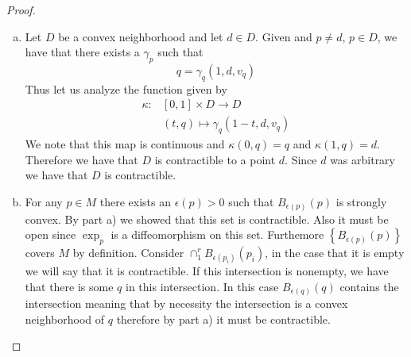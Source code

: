 \documentclass[a4paper]{article}
\begin{document}
\begin{proof}
  \begin{enumerate}[a)]
    \item Let $D$ be a convex neighborhood and let $d \in D$. Given and $p \neq d$, $p \in D$, we have that there exists a $\gamma_p$ such that
      \[
        q = \gamma_q(1, d, v_q)
      \]
      Thus let us analyze the function given by 
      \[
        \begin{aligned}
          \kappa: &[0,1] \times D \rightarrow D \\
                  &(t,q) \mapsto \gamma_q(1 - t, d, v_q) 
        \end{aligned}
      \]
      We note that this map is continuous and $\kappa(0, q) = q$ and $\kappa(1,q) = d$. Therefore we have that $D$ is contractible to a point $d$. Since $d$ was arbitrary we have that $D$ is contractible.
    \item For any $p \in M$ there exists an $\epsilon(p) > 0$ such that $B_{\epsilon(p)}(p)$ is strongly convex. By part a) we showed that this set is contractible. Also it must be open since $\exp_p$ is a diffeomorphism on this set. Furthemore $\left\{ B_{\epsilon(p)}(p) \right\}$ covers $M$ by definition. Consider $\cap_1^r B_{\epsilon(p_i)}(p_i)$, in the case that it is empty we will say that it is contractible. If this intersection is nonempty, we have that there is some $q$ in this intersection. In this case $B_{\epsilon(q)}(q)$ contains the intersection meaning that by necessity the intersection is a convex neighborhood of $q$ therefore by part a) it must be contractible.
  \end{enumerate}
\end{proof}
\end{document}

